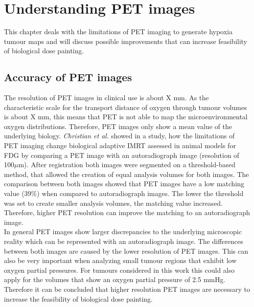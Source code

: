 
\section{Understanding PET images}
This chapter deals with the limitations of PET imaging to generate hypoxia tumour maps and will discuss possible improvements that can increase feasibility of biological dose painting.
\subsection{Accuracy of PET images}\label{chap:petaccuracy}
The resolution of PET images in clinical use is about X mm. As the characteristic scale for the transport distance of oxygen through tumour volumes is about X mm, this means that PET is not able to map the microenvironmental oxygen distributions. Therefore, PET images only show a mean value of the underlying biology. \textit{Christian et al.} \cite{pmid19097661, pmid19293465} showed in a study, how the limitations of PET imaging change biological adaptive IMRT assessed in animal models for FDG by comparing a PET image with an autoradiograph image (resolution of 100$\mu$m). After registration both images were segmented on a threshold-based method, that allowed the creation of equal analysis volumes for both images. The comparison between both images showed that PET images have a low matching value (39\%) when compared to autoradiograph images. The lower the threshold was set to create smaller analysis volumes, the matching value increased. Therefore, higher PET resolution can improve the matching to an autoradiograph image.\\In general PET images show larger discrepancies to the underlying microscopic reality which can be represented with an autoradiograph image. The differences between both images are caused by the lower resolution of PET images. This can also be very important when analyzing small tumour regions that exhibit low oxygen partial pressures. For tumours considered in this work this could also apply for the volumes that show an oxygen partial pressure of 2.5 mmHg. Therefore it can be concluded that higher resolution PET images are necessary to increase the feasibility of biological dose painting.
